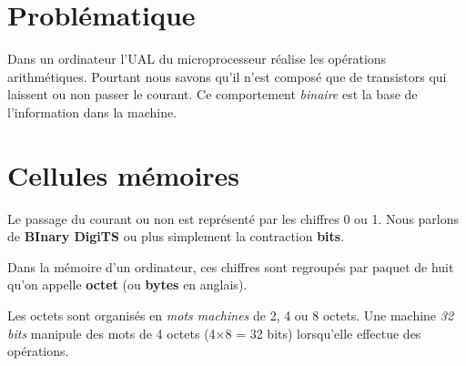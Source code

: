 \documentclass[a4paper,11pt]{article}
\begin{document}
\begin{Form}
\section{Problématique}
Dans un ordinateur l'UAL du microprocesseur réalise les opérations arithmétiques. Pourtant nous savons qu'il n'est composé que de transistors qui laissent ou non passer le courant. Ce comportement \emph{binaire} est la base de l'information dans la machine.
\begin{center}
\end{center}
\section{Cellules mémoires}
Le passage du courant ou non est représenté par les chiffres 0 ou 1. Nous parlons de \textbf{BInary DigiTS} ou plus simplement la contraction \textbf{bits}. 
\begin{figure}[!h]
\centering
{}
\end{figure}

Dans la mémoire d'un ordinateur, ces chiffres sont regroupés par paquet de huit qu'on appelle \textbf{octet} (ou \textbf{bytes} en anglais).
\begin{figure}[!h]
\centering
{}
\end{figure}
Les octets sont organisés en \emph{mots machines} de 2, 4 ou 8 octets. Une machine \emph{32 bits} manipule des mots de 4 octets (4×8 = 32 bits) lorsqu'elle effectue des opérations.
\begin{figure}[!h]
\centering
{}
\end{figure}
\end{Form}
\end{document}
